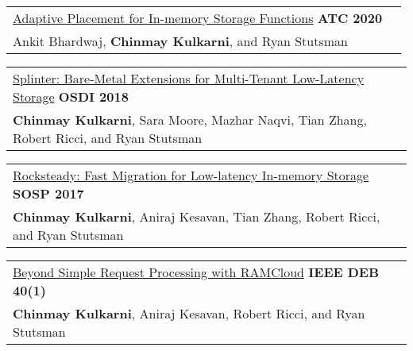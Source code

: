 \documentclass[margin,line]{res}
\begin{document}
\begin{resume}
 \vspace{-2.5pt}
 \begin{tabular}{@{}p{5.5in}p{4in}}
 \href{http://utah.systems/projects/kulkarni\_splinter}{Adaptive
 Placement for In-memory Storage Functions} \hfill
 {\small\bf ATC 2020}\\
 {\small Ankit Bhardwaj, {\bf Chinmay Kulkarni}, and Ryan Stutsman}\\
 \end{tabular}

 \vspace{-2.5pt}
 \begin{tabular}{@{}p{5.5in}p{4in}}
 \href{http://utah.systems/projects/kulkarni\_splinter}{Splinter:
 Bare-Metal Extensions for Multi-Tenant Low-Latency Storage} \hfill
 {\small\bf OSDI 2018}\\
 {\small{\bf Chinmay Kulkarni}, Sara Moore, Mazhar Naqvi, Tian Zhang, Robert
 Ricci, and Ryan Stutsman}\\
 \end{tabular}

 \vspace{-2.5pt}
 \begin{tabular}{@{}p{5.5in}p{4in}}
 \href{http://utah.systems/projects/kulkarni\_rocksteady}{Rocksteady: Fast
 Migration for Low-latency In-memory Storage} \hfill
 {\small\bf SOSP 2017}\\
 {\small{\bf Chinmay Kulkarni}, Aniraj Kesavan, Tian Zhang, Robert
 Ricci, and Ryan Stutsman}\\
 \end{tabular}

 \vspace{-2.5pt}
 \begin{tabular}{@{}p{5.5in}p{4in}}
 \href{http://sites.computer.org/debull/A17mar/p62.pdf}{Beyond Simple
 Request Processing with RAMCloud} \hfill
 {\small\bf IEEE DEB 40(1)}\\
 {\small {\bf Chinmay Kulkarni}, Aniraj Kesavan, Robert Ricci, and Ryan
 Stutsman}\\
 \end{tabular}



\end{resume}
\end{document}
